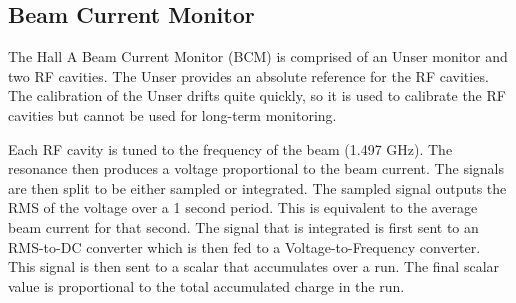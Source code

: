 \subsection{Beam Current Monitor}

The Hall A Beam Current Monitor (BCM) is comprised of an Unser monitor and two RF cavities. The Unser provides an absolute reference for the RF cavities. The calibration of the Unser drifts quite quickly, so it is used to calibrate the RF cavities but cannot be used for long-term monitoring.

Each RF cavity is tuned to the frequency of the beam (1.497 GHz). The resonance then produces a voltage proportional to the beam current. The signals are then split to be either sampled or integrated. The sampled signal outputs the RMS of the voltage over a 1 second period. This is equivalent to the average beam current for that second. The signal that is integrated is first sent to an RMS-to-DC converter which is then fed to a Voltage-to-Frequency converter. This signal is then sent to a scalar that accumulates over a run. The final scalar value is proportional to the total accumulated charge in the run.